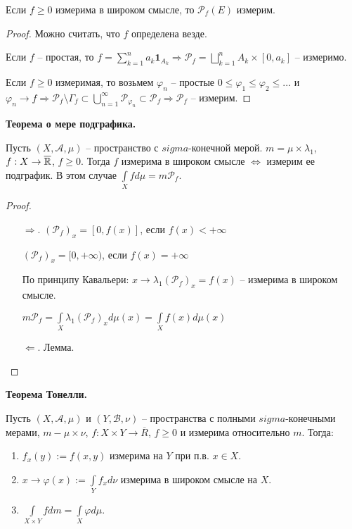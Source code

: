 \begin{lemma}
    Если $f\geq 0$ измерима в широком смысле, то $\mathcal{P}_f(E)$ измерим.
\end{lemma}

\begin{proof}
    Можно считать, что $f$ определена везде.

    Если $f$ – простая, то $f=\sum\limits_{k=1}^n a_k \mathbf{1}_{A_k}\Rightarrow\mathcal{P}_f =
    \bigsqcup\limits_{k=1}^n A_k\times [0, a_k]$ – измеримо.

    Если $f\geq 0$ измеримая, то возьмем $\varphi_n$ – простые $0\leq \varphi_1\leq \varphi_2\leq ...$ и $\varphi_n\rightarrow f
    \Rightarrow \mathcal{P}_f \setminus \Gamma_f\subset \bigcup\limits_{n=1}^\infty \mathcal{P}_{\varphi_n} \subset \mathcal{P}_f
    \Rightarrow\mathcal{P}_f$ – измерим.
\end{proof}

\begin{theorem}
    \textbf{Теорема о мере подграфика.}

    Пусть $(X, \mathcal{A}, \mu)$ – пространство с $sigma$-конечной мерой. $m=\mu \times \lambda_1$, $f:X\rightarrow \overline{\mathbb{R}}$,
    $f\geq 0$. Тогда $f$ измерима в широком смысле $\Leftrightarrow$ измерим ее подграфик. В этом случае $\int\limits_X f d\mu = m \mathcal{P}_f$.
\end{theorem}

\begin{proof}~
    \begin{enumerate}
        \item[$\Rightarrow$.] $(\mathcal{P}_f)_x= [0, f(x)]$, если $f(x)<+\infty$
        
        $(\mathcal{P}_f)_x= [0, +\infty)$, если $f(x)=+\infty$

        По принципу Кавальери: $x\rightarrow \lambda_1 (\mathcal{P}_f)_x=f(x)$ – измерима в широком смысле.

        $m\mathcal{P}_f = \int\limits_X \lambda_1 (\mathcal{P}_f)_x d\mu (x) = \int\limits_X f(x) d\mu (x)$
        
        \item[$\Leftarrow$.] Лемма.
    \end{enumerate}
\end{proof}

\begin{theorem}
    \textbf{Теорема Тонелли.}

    Пусть $(X, \mathcal{A}, \mu)$ и $(Y, \mathcal{B}, \nu)$ – пространства с полными $sigma$-конечными мерами,
    $m - \mu \times \nu$, $f:X\times Y\rightarrow \overline{R}$, $f\geq 0$ и измерима относительно $m$. Тогда:

    \begin{enumerate}
        \item $f_x(y):= f(x, y)$ измерима на $Y$ при п.в. $x\in X$.
        \item $x\rightarrow \varphi(x):= \int\limits_Y f_x d\nu$ измерима в широком смысле на $X$.
        \item $\int\limits_{X\times Y} f dm=\int\limits_X \varphi d\mu$.
    \end{enumerate}
\end{theorem}


